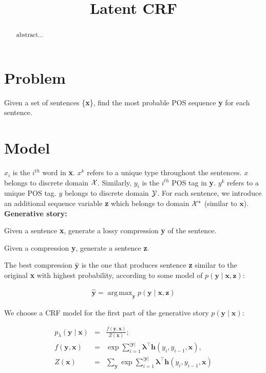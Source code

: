 \documentclass[11pt,onecolumn]{article}
\title{Latent CRF}
\date{}
\DeclareMathOperator*{\argmax}{arg\,max}
\newenvironment{itemizesquish}{\begin{list}{\labelitemi}{\setlength{\itemsep}{0em}\setlength{\labelwidth}{0.5em}\setlength{\leftmargin}{\labelwidth}\addtolength{\leftmargin}{\labelsep}}}{\end{list}}
\begin{document}
\maketitle
\begin{abstract}
abstract...
\end{abstract}

\section{Problem}

Given a set of sentences \{\textbf{x}\}, find the most probable POS sequence \textbf{y} for each sentence. 

\section{Model}

$x_i$ is the $i^{th}$ word in \textbf{x}. $x^k$ refers to a unique type throughout the sentences. $x$ belongs to discrete domain $\cal{X}$. 
Similarly, $y_i$ is the $i^{th}$ POS tag in \textbf{y}. $y^k$ refers to a unique POS tag. $y$ belongs to discrete domain $\cal{Y}$. 
For each sentence, we introduce an additional sequence variable \textbf{z} which belongs to domain $\cal{X}^*$ (similar to $\mathbf{x}$).\\


\textbf{Generative story:}
\begin{itemizesquish}
\item Given a sentence \textbf{x}, generate a lossy compression \textbf{y} of the sentence.
\item Given a compression \textbf{y}, generate a sentence \textbf{z}.
\end{itemizesquish}

The best compression $\hat{\mathbf{y}}$ is the one that produces sentence \textbf{z} similar to the original \textbf{x} with highest probability, according to some model of $p(\mathbf{y} \mid \mathbf{x}, \mathbf{z})$:

\begin{eqnarray}
\hat{\mathbf{y}} = \argmax_\mathbf{y} p(\mathbf{y} \mid \mathbf{x}, \mathbf{z}) 
\end{eqnarray}

We choose a CRF model for the first part of the generative story $p(\mathbf{y} \mid \mathbf{x})$:

\begin{eqnarray}
p_\lambda(\mathbf{y}\mid\mathbf{x}) &=& \frac{f(\mathbf{y}, \mathbf{x})}{Z(\mathbf{x})}; \\
f(\mathbf{y}, \mathbf{x}) &=& \exp \sum_{i=1}^{|\mathbf{y}|} \boldsymbol{\lambda}^\top \mathbf{h}(y_i, y_{i-1}, \mathbf{x}), \\
Z(\mathbf{x}) &=& \sum_\mathbf{y} \exp \sum_{i=1}^{|\mathbf{y}|} \boldsymbol{\lambda}^\top \mathbf{h}(y_i, y_{i-1}, \mathbf{x})
\end{eqnarray}
\end{document}

